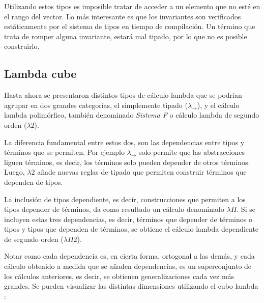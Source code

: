 \documentclass[]{report}
\begin{document}
	Utilizando estos tipos es imposible tratar de acceder a un elemento que no esté en el rango del vector.
	Lo más interesante es que los invariantes son verificados estáticamente por el sistema de tipos en tiempo de compilación. Un término que trata de romper alguna invariante, estará mal tipado, por lo que no es posible construirlo.

	
	\subsection{Lambda cube}
	Hasta ahora se presentaron distintos tipos de cálculo lambda que se podrían agrupar en dos grandes categorías, el simplemente tipado ($\lambda_{\to}$), y el cálculo lambda polimórfico, también denominado \textit{Sistema F} o cálculo lambda de segundo orden ($\lambda 2$).
	
	La diferencia fundamental entre estos dos, son las dependencias entre tipos y términos que se permiten.
	Por ejemplo $\lambda_{\to}$ solo permite que las abstracciones liguen términos, es decir, los términos solo pueden depender de otros términos.
	Luego, $\lambda 2$ añade nuevas reglas de tipado que permiten construir términos que dependen de tipos.
	
	La inclusión de tipos dependiente, es decir, construcciones que permiten a los tipos depender de términos, da como resultado un cálculo denominado $\lambda\Pi$.
	Si se incluyen estas tres dependencias, es decir, términos que depender de términos o tipos y tipos que dependen de términos, se obtiene el cálculo lambda dependiente de segundo orden ($\lambda\Pi 2$).
	
	Notar como cada dependencia es, en cierta forma, ortogonal a las demás, y cada cálculo obtenido a medida que se añaden dependencias, es un superconjunto de los cálculos anteriores, es decir, se obtienen generalizaciones cada vez más grandes.
	Se pueden visualizar las distintas dimensiones utilizando el cubo lambda \cite{lambda_cube}:
	
\end{document}
